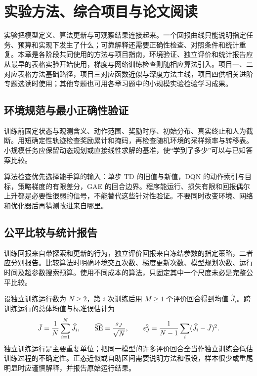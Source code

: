\setcounter{chapter}{23} %
\chapter{实验方法、综合项目与论文阅读}
\label{ch:rl-experiments}

实验把模型定义、算法更新与可观察结果连接起来。一个回报曲线只能说明指定任务、预算和实现下发生了什么；可靠解释还需要正确性检查、对照条件和统计重复。本章是各阶段共同使用的方法与项目指南，环境验证、独立评价和统计报告应从最早的表格实验开始使用，梯度与网络训练检查则随相应算法引入。项目一、二对应表格方法基础路径，项目三对应函数近似与深度方法主线，项目四供相关进阶专题选读时使用；其他专题也可用各章习题中的小规模实验检验学习成果。

\section{环境规范与最小正确性验证}

训练前固定状态与观测含义、动作范围、奖励时序、初始分布、真实终止和人为截断。用短确定性轨迹检查奖励累计和掩码，再检查随机环境的采样频率与转移表。小规模任务应保留动态规划或直接线性求解的基准，使“学到了多少”可以与已知答案比较。

算法检查优先选择能手算的输入：单步 TD 的旧值与新值，DQN 的动作索引与目标，策略梯度的有限差分，GAE 的回合边界。程序能运行、损失有限和回报偶尔上升都是必要性很弱的信号，不能替代这些针对性验证。不要同时改变环境、网络和优化器后再猜测改进来自哪里。

\section{公平比较与统计报告}

训练回报来自带探索和更新的行为，独立评价回报来自冻结参数的指定策略，二者应分别报告。比较算法时明确环境交互次数、梯度更新次数、模型规划次数、运行时间及超参数搜索预算。使用不同成本的算法，只固定其中一个尺度未必是完整公平比较。

设独立训练运行数为 $N\geq2$，第 $i$ 次训练后用 $M\geq1$ 个评价回合得到均值 $\widehat J_i$。跨训练运行的总体均值与标准误估计为
\[
\bar J=\frac1N\sum_{i=1}^N\widehat J_i,\qquad
\widehat{\rm SE}=\frac{s_J}{\sqrt N},\qquad
s_J^2=\frac1{N-1}\sum_i(\widehat J_i-\bar J)^2.
\]
独立训练运行是主要重复单位；把同一模型的许多评价回合全当作独立训练会低估训练过程的不确定性。正态近似或自助区间需要说明方法和假设，样本很少或重尾明显时应谨慎解释，并报告原始运行结果。

